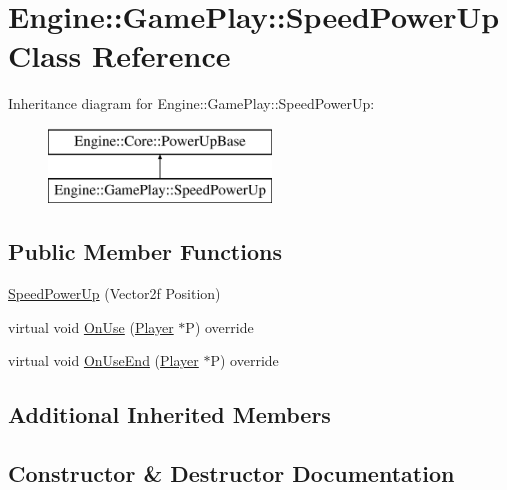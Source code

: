 \hypertarget{class_engine_1_1_game_play_1_1_speed_power_up}{}\section{Engine\+:\+:Game\+Play\+:\+:Speed\+Power\+Up Class Reference}
\label{class_engine_1_1_game_play_1_1_speed_power_up}
Inheritance diagram for Engine\+:\+:Game\+Play\+:\+:Speed\+Power\+Up\+:\begin{figure}[H]
\begin{center}
\leavevmode
\includegraphics[height=2.000000cm]{class_engine_1_1_game_play_1_1_speed_power_up}
\end{center}
\end{figure}
\subsection*{Public Member Functions}
\begin{DoxyCompactItemize}
\item 
\hyperlink{class_engine_1_1_game_play_1_1_speed_power_up_ac619eef8e87815cc58a256ddde54d049}{Speed\+Power\+Up} (Vector2f Position)
\item 
virtual void \hyperlink{class_engine_1_1_game_play_1_1_speed_power_up_a0901961fb01656a2b81ccf846e370e31}{On\+Use} (\hyperlink{class_engine_1_1_game_play_1_1_player}{Player} $\ast$P) override
\item 
virtual void \hyperlink{class_engine_1_1_game_play_1_1_speed_power_up_ad305e70493c2b51a87e58d58cea73521}{On\+Use\+End} (\hyperlink{class_engine_1_1_game_play_1_1_player}{Player} $\ast$P) override
\end{DoxyCompactItemize}
\subsection*{Additional Inherited Members}


\subsection{Constructor \& Destructor Documentation}
\mbox{\label{class_engine_1_1_game_play_1_1_speed_power_up_ac619eef8e87815cc58a256ddde54d049}} 
